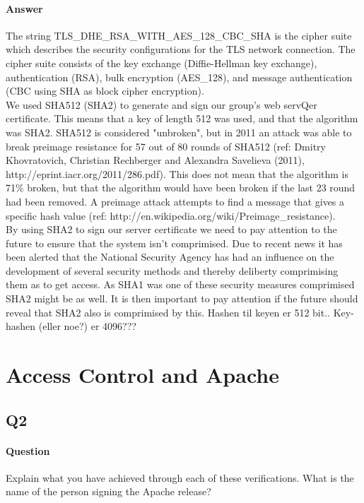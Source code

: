 \documentclass[11pt, a4paper]{article}
\begin{document}
\paragraph{Answer} 
The string TLS\_DHE\_RSA\_WITH\_AES\_128\_CBC\_SHA is the cipher suite which describes the security configurations for the TLS network connection. The cipher suite consists of the key exchange (Diffie-Hellman key exchange), authentication (RSA), bulk encryption (AES\_128), and message authentication (CBC using SHA as block cipher encryption).\\

We used SHA512 (SHA2) to generate and sign our group's web servQer certificate. This means that a key of length 512 was used, and that the algorithm was SHA2. SHA512 is considered "unbroken", but in 2011 an attack was able to break preimage resistance  for 57 out of 80 rounds of SHA512 (ref: Dmitry Khovratovich, Christian Rechberger and Alexandra Savelieva (2011), http://eprint.iacr.org/2011/286.pdf). This does not mean that the algorithm is 71\% broken, but that the algorithm would have been broken if the last 23 round had been removed. A preimage attack attempts to find a message that gives a specific hash value (ref: http://en.wikipedia.org/wiki/Preimage\_resistance).\\

By using SHA2 to sign our server certificate we need to pay attention to the future to ensure that the system isn't comprimised. Due to recent news it has been alerted that the National Security Agency has had an influence on the development of several security methods and thereby deliberty comprimising them as to get access. As SHA1 was one of these security measures comprimised SHA2 might be as well. It is then important to pay attention if the future should reveal that SHA2 also is comprimised by this.
Hashen til keyen er 512 bit.. Key-hashen (eller noe?) er 4096???
\section{Access Control and Apache}
\subsection{Q2}
\paragraph{Question}
Explain what you have achieved through each of these verifications. What is the name
of the person signing the Apache release?
\end{document}

